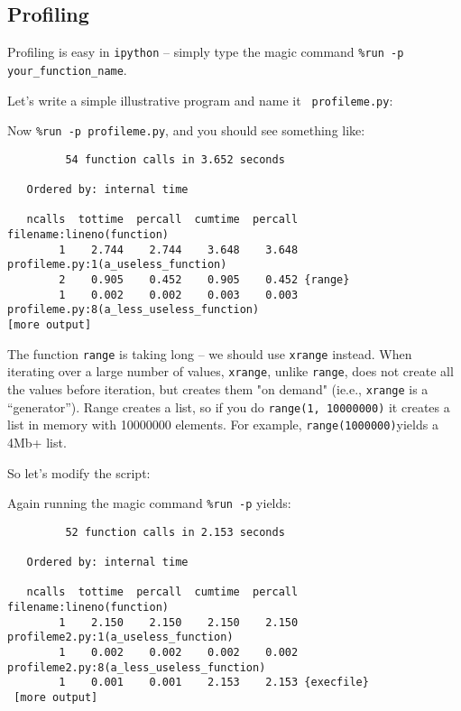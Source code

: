 \subsection{Profiling}

Profiling is easy in {\tt ipython} -- simply type the 
magic command {\tt \%run -p your\_function\_name}. 

Let's write a simple illustrative program and name it {\tt 
profileme.py}:


Now {\tt \%run -p profileme.py}, and you should see something like:
  
\begin{lstlisting}
         54 function calls in 3.652 seconds

   Ordered by: internal time

   ncalls  tottime  percall  cumtime  percall filename:lineno(function)
        1    2.744    2.744    3.648    3.648 profileme.py:1(a_useless_function)
        2    0.905    0.452    0.905    0.452 {range}
        1    0.002    0.002    0.003    0.003 profileme.py:8(a_less_useless_function)
[more output]        
\end{lstlisting}
     
The function {\tt range} is taking long -- we should use {\tt xrange} 
instead. When iterating over a large number of values, {\tt xrange}, 
unlike {\tt range}, does not create all the values before iteration, 
but creates them "on demand" (ie.e., {\tt xrange} is a ``generator''). Range creates a list, so if you do {\tt range(1, 10000000)} it creates a list in memory with 10000000 elements. For example, {\tt range(1000000)}yields a 4Mb+ list. 

So let's modify the script:



Again running the magic command {\tt \%run -p} yields:

\begin{lstlisting}
         52 function calls in 2.153 seconds

   Ordered by: internal time

   ncalls  tottime  percall  cumtime  percall filename:lineno(function)
        1    2.150    2.150    2.150    2.150 profileme2.py:1(a_useless_function)
        1    0.002    0.002    0.002    0.002 profileme2.py:8(a_less_useless_function)
        1    0.001    0.001    2.153    2.153 {execfile}
 [more output]

\end{lstlisting}
    
